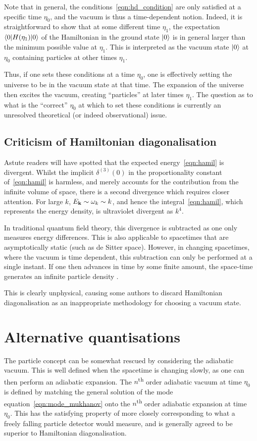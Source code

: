 Note that in general, the conditions~\eqref{eqn:hd_condition} are only satisfied at a specific time \(\eta_0\), and the vacuum is thus a time-dependent notion. 
Indeed, it is straightforward to show that at some different time \(\eta_1\), the expectation \(\left\langle0\middle|H(\eta_1)\middle|0\right\rangle\) of the Hamiltonian in the ground state \(\left|0\right\rangle\) is in general larger than the minimum possible value at \(\eta_1\). This is interpreted as the vacuum state \(\left|0\right\rangle\) at \(\eta_0\) containing particles at other times \(\eta_1\).

Thus, if one sets these conditions at a time \(\eta_0\), one is effectively setting the universe to be in the vacuum state at that time. The expansion of the universe then excites the vacuum, creating ``particles'' at later times \(\eta_1\). The question as to what is the ``correct'' \(\eta_0\) at which to set these conditions is currently an unresolved theoretical (or indeed observational) issue. 


\subsection{Criticism of Hamiltonian diagonalisation}

Astute readers will have spotted that the expected energy~\eqref{eqn:hamil} is divergent. Whilst the implicit \(\delta^{(3)}(0)\) in the proportionality constant of~\eqref{eqn:hamil} is harmless, and merely accounts for the contribution from the infinite volume of space, there is a second divergence which requires closer attention. For large \(k\), \(E_{\mathbf{k}}\sim \omega_k \sim k\), and hence the integral~\eqref{eqn:hamil}, which represents the energy density, is ultraviolet divergent as \(k^4\). 

In traditional quantum field theory, this divergence is subtracted as one only measures energy differences. This is also applicable to spacetimes that are asymptotically static (such as de Sitter space).
However, in changing spacetimes, where the vacuum is time dependent, this subtraction can only be performed at a single instant. If one then advances in time by some finite amount, the space-time generates an infinite particle density \citep{Fulling_HD,Fulling+1989}. 

This is clearly unphysical, causing some authors \citep{Fulling_HD} to discard Hamiltonian diagonalisation as an inappropriate methodology for choosing a vacuum state.

\section{Alternative quantisations}
The particle concept can be somewhat rescued by considering the adiabatic vacuum. This is well defined when the spacetime is changing slowly, as one can then perform an adiabatic expansion. The \(n\)\textsuperscript{th} order adiabatic vacuum at time \(\eta_0\) is defined by matching the general solution of the mode equation~\eqref{eqn:mode_mukhanov} onto the \(n\)\textsuperscript{th} order adiabatic expansion at time \(\eta_0\). This has the satisfying property of more closely corresponding to what a freely falling particle detector would measure, and is generally agreed to be superior to Hamiltonian diagonalisation.

